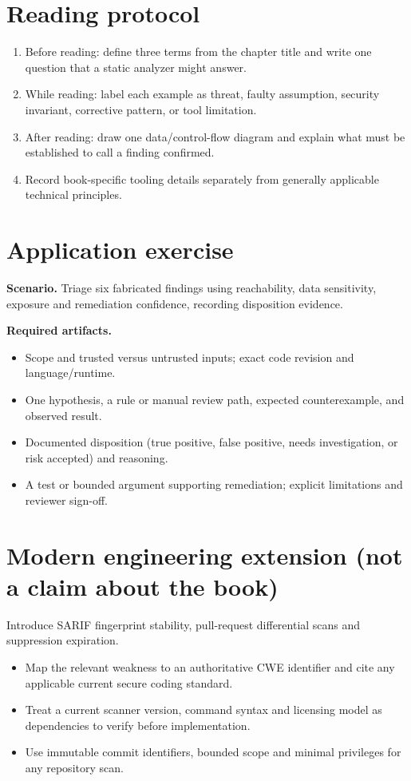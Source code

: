 \documentclass[10pt,letterpaper]{article}
\begin{document}
\section{Reading protocol}
\begin{enumerate}
\item Before reading: define three terms from the chapter title and write one question that a static analyzer might answer.
\item While reading: label each example as threat, faulty assumption, security invariant, corrective pattern, or tool limitation.
\item After reading: draw one data/control-flow diagram and explain what must be established to call a finding confirmed.
\item Record book-specific tooling details separately from generally applicable technical principles.
\end{enumerate}

\section{Application exercise}
\textbf{Scenario.} Triage six fabricated findings using reachability, data sensitivity, exposure and remediation confidence, recording disposition evidence.

\textbf{Required artifacts.}\begin{itemize}
\item Scope and trusted versus untrusted inputs; exact code revision and language/runtime.
\item One hypothesis, a rule or manual review path, expected counterexample, and observed result.
\item Documented disposition (true positive, false positive, needs investigation, or risk accepted) and reasoning.
\item A test or bounded argument supporting remediation; explicit limitations and reviewer sign-off.
\end{itemize}

\section{Modern engineering extension (not a claim about the book)}
Introduce SARIF fingerprint stability, pull-request differential scans and suppression expiration.

\begin{itemize}
\item Map the relevant weakness to an authoritative CWE identifier and cite any applicable current secure coding standard.
\item Treat a current scanner version, command syntax and licensing model as dependencies to verify before implementation.
\item Use immutable commit identifiers, bounded scope and minimal privileges for any repository scan.
\end{itemize}
\end{document}

